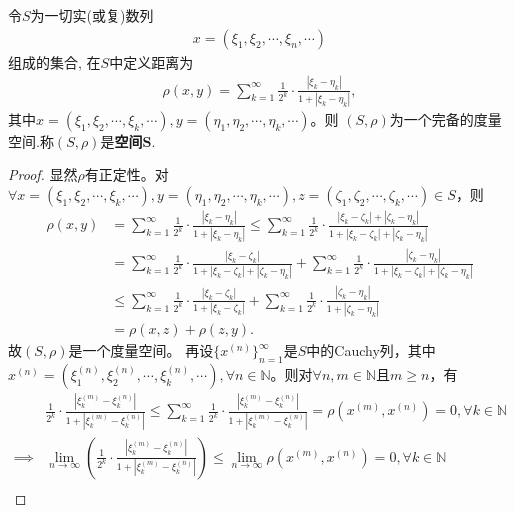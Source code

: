 \documentclass[../../main.tex]{subfiles}%
\begin{document}
\begin{proposition}\label{proposition:空间S是完备度量空间}
令$S$为一切实(或复)数列
\begin{align*}
x=(\xi_1,\xi_2,\cdots,\xi_n,\cdots)
\end{align*}
组成的集合, 在$S$中定义距离为
\begin{align*}
\rho(x,y)=\sum\limits_{k=1}^{\infty}\frac{1}{2^k}\cdot\frac{|\xi_k-\eta_k|}{1+|\xi_k-\eta_k|},
\end{align*}
其中$x=(\xi_1,\xi_2,\cdots,\xi_k,\cdots), y=(\eta_1,\eta_2,\cdots,\eta_k,\cdots)$。则 $(S,\rho)$为一个完备的度量空间.称$(S,\rho)$是\textbf{空间}$\bm{S}$.
\end{proposition}
\begin{proof}

显然$\rho$有正定性。对$\forall x=(\xi_1,\xi_2,\cdots,\xi_k,\cdots),y=(\eta_1,\eta_2,\cdots,\eta_k,\cdots),z=(\zeta_1,\zeta_2,\cdots,\zeta_k,\cdots)\in S$，则
\begin{align*}
\rho(x,y)&=\sum\limits_{k=1}^{\infty}\frac{1}{2^k}\cdot\frac{|\xi_k-\eta_k|}{1+|\xi_k-\eta_k|}\leqslant\sum\limits_{k=1}^{\infty}\frac{1}{2^k}\cdot\frac{|\xi_k-\zeta_k|+|\zeta_k-\eta_k|}{1+|\xi_k-\zeta_k|+|\zeta_k-\eta_k|}\\
&=\sum\limits_{k=1}^{\infty}\frac{1}{2^k}\cdot\frac{|\xi_k-\zeta_k|}{1+|\xi_k-\zeta_k|+|\zeta_k-\eta_k|}+\sum\limits_{k=1}^{\infty}\frac{1}{2^k}\cdot\frac{|\zeta_k-\eta_k|}{1+|\xi_k-\zeta_k|+|\zeta_k-\eta_k|}\\
&\leqslant\sum\limits_{k=1}^{\infty}\frac{1}{2^k}\cdot\frac{|\xi_k-\zeta_k|}{1+|\xi_k-\zeta_k|}+\sum\limits_{k=1}^{\infty}\frac{1}{2^k}\cdot\frac{|\zeta_k-\eta_k|}{1+|\zeta_k-\eta_k|}\\
&=\rho(x,z)+\rho(z,y).
\end{align*}
故$(S,\rho)$是一个度量空间。
再设$\{x^{(n)}\}_{n=1}^{\infty}$是$S$中的Cauchy列，其中$x^{(n)}=(\xi_1^{(n)},\xi_2^{(n)},\cdots,\xi_k^{(n)},\cdots),\forall n\in\mathbb{N}$。则对$\forall n,m\in\mathbb{N}$且$m\geqslant n$，有
\begin{align*}
&\frac{1}{2^k}\cdot\frac{|\xi_k^{(m)}-\xi_k^{(n)}|}{1+|\xi_k^{(m)}-\xi_k^{(n)}|}\leqslant\sum\limits_{k=1}^{\infty}\frac{1}{2^k}\cdot\frac{|\xi_k^{(m)}-\xi_k^{(n)}|}{1+|\xi_k^{(m)}-\xi_k^{(n)}|}=\rho(x^{(m)},x^{(n)})=0,\forall k\in\mathbb{N}\\
\implies&\lim\limits_{n\rightarrow\infty}\left(\frac{1}{2^k}\cdot\frac{|\xi_k^{(m)}-\xi_k^{(n)}|}{1+|\xi_k^{(m)}-\xi_k^{(n)}|}\right)\leqslant\lim\limits_{n\rightarrow\infty}\rho(x^{(m)},x^{(n)})=0,\forall k\in\mathbb{N}\\

\end{align*}
\end{proof}
\end{document}
